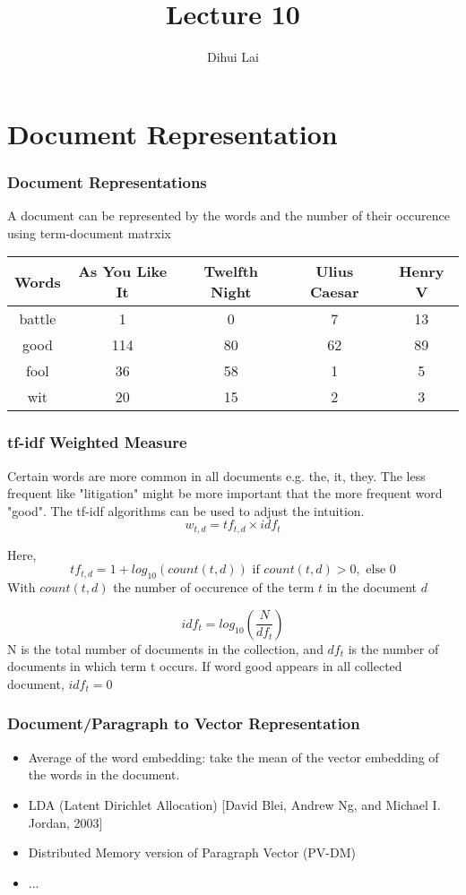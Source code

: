 \documentclass[notheorems, aspectratio=54]{beamer}
\title{Lecture 10}
\author{Dihui Lai}
\institute[WUSTL]{dlai@wustl.edu}
\begin{document}
\begin{frame}
    \titlepage
\end{frame}

\section{Document Representation}



\begin{frame}
\frametitle{Document Representations}
A document can be represented by the words and the number of their occurence using term-document matrxix
\begin{center}
 \begin{tabular}{c c c c c} 
 \hline
 Words & As You Like It& Twelfth Night& Ulius Caesar& Henry V\\ [0.5ex] 
 \hline\hline
 battle & 1 & 0 & 7 &13 \\ 
 \hline
 good & 114 & 80 &62 & 89\\
 \hline
 fool & 36 & 58 & 1 & 5 \\
 \hline
 wit & 20 & 15 & 2 & 3 \\
 \hline
\end{tabular}
\end{center}

\end{frame}


\begin{frame}
\frametitle{tf-idf Weighted Measure}
Certain words are more common in all documents e.g. the, it, they. The less frequent like "litigation" might be more important that the more frequent word "good". The tf-idf algorithms can be used to adjust the intuition.
$$
w_{t,d} = tf_{t,d}\times idf_{t}
$$

Here,
$$
tf_{t, d}=1 + log_{10}(count(t, d)) \text{ if } count(t, d) > 0, \text{ else } 0
$$
With $count(t, d)$  the number of occurence of the term $t$ in the document $d$

$$
idf_{t}=log_{10}\left(\frac{N}{df_t}\right)
$$ 
N is the total number of documents in the collection, and $df_t$ is the number of documents in which term t occurs. If word good appears in all collected document, $idf_t=0$

\end{frame}

\begin{frame}
\frametitle{Document/Paragraph to Vector Representation}

\begin{itemize}
\item Average of the word embedding: take the mean of the vector embedding of the words in the document. 
\item LDA (Latent Dirichlet Allocation) [David Blei, Andrew Ng, and Michael I. Jordan, 2003]
\item Distributed Memory version of Paragraph Vector (PV-DM)
\item ...
\end{itemize}

\end{frame}
\end{document}
